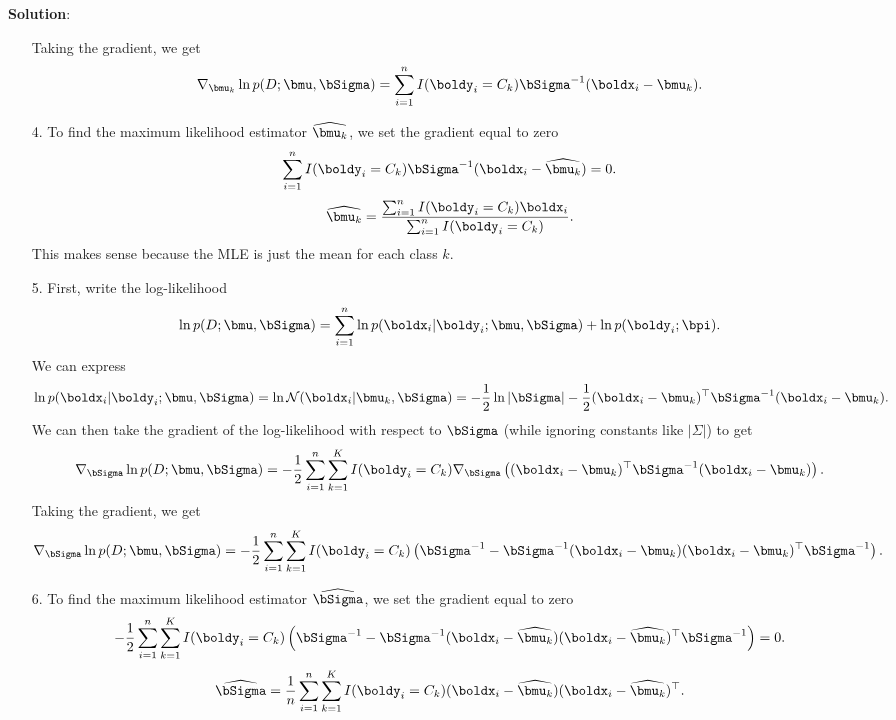 \documentclass[submit]{../harvardml}
\newenvironment{solution}{
    \vspace{2mm}
    \color{blue}\noindent\textbf{Solution}:
}{}
\begin{document}
\begin{solution}
\begin{itemize}
    Taking the gradient, we get
    $$
    \nabla_{\bmu_k} \ln p(D; \bmu, \bSigma) = \sum_{i=1}^n I(\boldy_i = C_k) \bSigma^{-1} (\boldx_i - \bmu_k).
    $$
    \item[4.] To find the maximum likelihood estimator $\widehat{\bmu_k}$, we set the gradient equal to zero 
    $$
    \sum_{i=1}^n I(\boldy_i = C_k) \bSigma^{-1} (\boldx_i - \widehat{\bmu_k}) = 0.
    $$
    $$
    \widehat{\bmu_k} = \frac{\sum_{i=1}^n I(\boldy_i = C_k) \boldx_i}{\sum_{i=1}^n I(\boldy_i = C_k)}.
    $$
    This makes sense because the MLE is just the mean for each class $k$.
    \item[5.] First, write the log-likelihood 
    $$
    \ln p(D; \bmu, \bSigma) = \sum_{i=1}^n \ln p(\boldx_i | \boldy_i; \bmu, \bSigma) + \ln p(\boldy_i; \bpi).
    $$
    We can express
    $$
    \ln p(\boldx_i | \boldy_i; \bmu, \bSigma) = \ln \mathcal{N}(\boldx_i | \bmu_k, \bSigma) = -\frac{1}{2} \ln |\bSigma| - \frac{1}{2} (\boldx_i - \bmu_k)^\top \bSigma^{-1} (\boldx_i - \bmu_k).
    $$
    We can then take the gradient of the log-likelihood with respect to $\bSigma$ (while ignoring constants like $|\Sigma|$) to get
    $$
    \nabla_{\bSigma} \ln p(D; \bmu, \bSigma) = -\frac{1}{2} \sum_{i=1}^n \sum_{k=1}^K I(\boldy_i = C_k) \nabla_{\bSigma} \left( (\boldx_i - \bmu_k)^\top \bSigma^{-1} (\boldx_i - \bmu_k)\right).
    $$
    Taking the gradient, we get
    $$
    \nabla_{\bSigma} \ln p(D; \bmu, \bSigma) = -\frac{1}{2} \sum_{i=1}^n \sum_{k=1}^K I(\boldy_i = C_k) \left( \bSigma^{-1} - \bSigma^{-1} (\boldx_i - \bmu_k) (\boldx_i - \bmu_k)^\top \bSigma^{-1}\right).
    $$
    \item[6.] To find the maximum likelihood estimator $\widehat{\bSigma}$, we set the gradient equal to zero
    $$
    -\frac{1}{2} \sum_{i=1}^n \sum_{k=1}^K I(\boldy_i = C_k) \left( \bSigma^{-1} - \bSigma^{-1} (\boldx_i - \widehat{\bmu_k}) (\boldx_i - \widehat{\bmu_k})^\top \bSigma^{-1}\right) = 0.
    $$
    $$
    \widehat{\bSigma} = \frac{1}{n} \sum_{i=1}^n \sum_{k=1}^K I(\boldy_i = C_k) (\boldx_i - \widehat{\bmu_k}) (\boldx_i - \widehat{\bmu_k})^\top.
    $$
    
    

    
  \end{itemize}
\end{solution}
\end{document}
